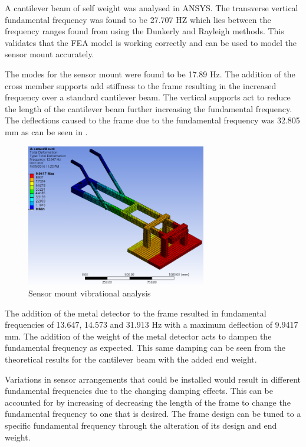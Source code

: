 \documentclass[main.tex]{subfiles}
\begin{document}
\begin{appendices}
A cantilever beam of self weight was analysed in ANSYS. The transverse vertical fundamental frequency was found to be 27.707 HZ which lies between the frequency ranges found from using the Dunkerly and Rayleigh methods. This validates that the FEA model is working correctly and can be used to model the sensor mount accurately.

The modes for the sensor mount were found to be 17.89 Hz. The addition of the cross member supports add stiffness to the frame resulting in the increased frequency over a standard cantilever beam. The vertical supports act to reduce the length of the cantilever beam further increasing the fundamental frequency. The deflections caused to the frame due to the fundamental frequency was 32.805 mm as can be seen in . 

\begin{figure}[ht]
\includegraphics[width=0.7\textwidth]{4-DetailedDesign/vibrations.PNG}
\centering
\caption{Sensor mount vibrational analysis} 
\end{figure} 

The addition of the metal detector to the frame resulted in fundamental frequencies of 13.647, 14.573 and 31.913 Hz with a maximum deflection of 9.9417 mm. The addition of the weight of the metal detector acts to dampen the fundamental frequency as expected. This same damping can be seen from the theoretical results for the cantilever beam with the added end weight.

Variations in sensor arrangements that could be installed would result in different fundamental frequencies due to the changing damping effects. This can be accounted for by increasing of decreasing the length of the frame to change the fundamental frequency to one that is desired. The frame design can be tuned to a specific fundamental frequency through the alteration of its design and end weight.   



\end{appendices}
\end{document}
